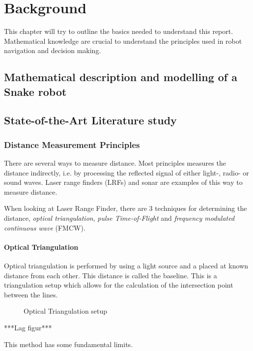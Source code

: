 

\chapter{Background}
This chapter will try to outline the basics needed to understand this report. Mathematical
knowledge are crucial to understand the principles used in robot navigation and decision
making. 


\section{Mathematical description and modelling of a Snake robot}


\section{State-of-the-Art Literature study}


\subsection{Distance Measurement Principles}
There are several ways to measure distance. Most principles measures the distance
indirectly, i.e. by processing the reflected signal of either light-, radio- or
sound waves. Laser range finders (LRFs) and sonar are examples of this way to measure
distance. 

When looking at Laser Range Finder, there are 3 techniques for determining the distance,
\emph{optical triangulation}, \emph{pulse Time-of-Flight} and \emph{frequency modulated
continuous wave} (FMCW). \cite{laser-ranging-critical-review}

\subsubsection{Optical Triangulation}
Optical triangulation is performed by using a light source and a placed at known distance
from each other. This distance is called the baseline. This is a triangulation setup which
allows for the calculation of the intersection point between the lines. 

\begin{figure}[htbp]
    \caption{Optical Triangulation setup}
    \label{fig:optical-triangulation}
\end{figure}
***Lag figur***

This method has some fundamental limits. \cite{laser-ranging-critical-review} 

